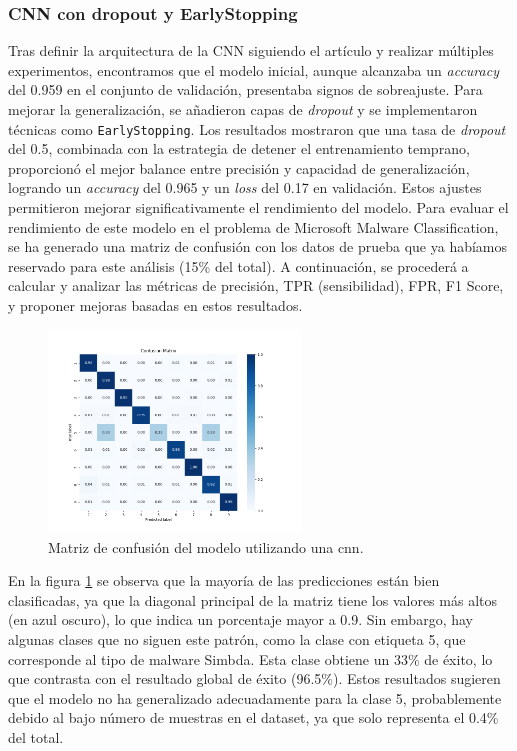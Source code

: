 \subsubsection*{CNN con dropout y EarlyStopping}
Tras definir la arquitectura de la CNN siguiendo el artículo \citep{kalash2018malware} y realizar múltiples experimentos, encontramos que el modelo inicial, aunque alcanzaba un \textit{accuracy} del 0.959 en el conjunto de validación, presentaba signos de sobreajuste. Para mejorar la generalización, se añadieron capas de \textit{dropout} y se implementaron técnicas como \lstinline|EarlyStopping|. Los resultados mostraron que una tasa de \textit{dropout} del 0.5, combinada con la estrategia de detener el entrenamiento temprano, proporcionó el mejor balance entre precisión y capacidad de generalización, logrando un \textit{accuracy} del 0.965 y un \textit{loss} del 0.17 en validación. Estos ajustes permitieron mejorar significativamente el rendimiento del modelo. Para evaluar el rendimiento de este modelo en el problema de Microsoft Malware Classification, se ha generado una matriz de confusión con los datos de prueba que ya habíamos reservado para este análisis (15\% del total). A continuación, se procederá a calcular y analizar las métricas de precisión, TPR (sensibilidad), FPR, F1 Score, y proponer mejoras basadas en estos resultados.

\begin{figure}[H]
    \centering
    \includegraphics[width=0.6\textwidth]{img/confusionMatrixCNNNormal1.png}
    \caption{Matriz de confusión del modelo utilizando una \acrshort{cnn}.}
    \label{fig: cnnConfusionMatrix}
\end{figure}

En la figura \ref{fig: cnnConfusionMatrix} se observa que la mayoría de las predicciones están bien clasificadas, ya que la diagonal principal de la matriz tiene los valores más altos (en azul oscuro), lo que indica un porcentaje mayor a 0.9. Sin embargo, hay algunas clases que no siguen este patrón, como la clase con etiqueta 5, que corresponde al tipo de malware Simbda. Esta clase obtiene un 33\% de éxito, lo que contrasta con el resultado global de éxito (96.5\%). Estos resultados sugieren que el modelo no ha generalizado adecuadamente para la clase 5, probablemente debido al bajo número de muestras en el dataset, ya que solo representa el 0.4\% del total.


